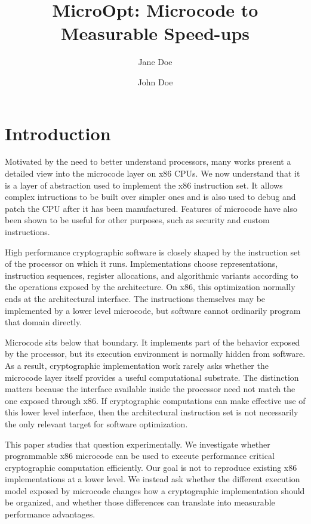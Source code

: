 \documentclass[journal=tches,submission]{iacrtrans}
\author{Jane Doe\inst{1,2} \and John Doe\inst{1}}
\institute{
  Institute A, City, Country, \email{jane@institute}
  \and
  Institute B, City, Country, \email{john@institute}
}
\title{MicroOpt: Microcode to Measurable Speed-ups}
\begin{document}
\maketitle




\begin{abstract}
  
\end{abstract}


\section{Introduction}

Motivated by the need to better understand processors, many works present a detailed view into the microcode layer on x86 CPUs.
We now understand that it is a layer of abstraction used to implement the x86 instruction set. 
It allows complex intructions to be built over simpler ones and is also used to debug and patch the CPU after it has been manufactured.
Features of microcode have also been shown to be useful for other purposes, such as security and custom instructions.

High performance cryptographic software is closely shaped by the instruction set of the processor on which it runs. 
Implementations choose representations, instruction sequences, register allocations, and algorithmic variants according to the operations exposed by the architecture. 
On x86, this optimization normally ends at the architectural interface. 
The instructions themselves may be implemented by a lower level microcode, but software cannot ordinarily program that domain directly.

Microcode sits below that boundary. 
It implements part of the behavior exposed by the processor, but its execution environment is normally hidden from software. 
As a result, cryptographic implementation work rarely asks whether the microcode layer itself provides a useful computational substrate. 
The distinction matters because the interface available inside the processor need not match the one exposed through x86. 
If cryptographic computations can make effective use of this lower level interface, then the architectural instruction set is not necessarily the only relevant target for software optimization.

This paper studies that question experimentally. 
We investigate whether programmable x86 microcode can be used to execute performance critical cryptographic computation efficiently. 
Our goal is not to reproduce existing x86 implementations at a lower level. 
We instead ask whether the different execution model exposed by microcode changes how a cryptographic implementation should be organized, and whether those differences can translate into measurable performance advantages.
\end{document}
